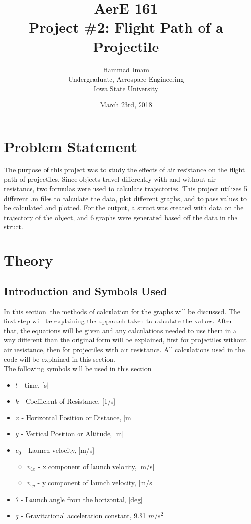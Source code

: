 \documentclass[oneside]{article}
\title{AerE 161 \\ Project \#2: Flight Path of a Projectile}
\author{Hammad Imam \\ Undergraduate, Aerospace Engineering \\ Iowa State University}
\date{March 23rd,	2018}
\begin{document}
\begin{titlepage}
\maketitle
\end{titlepage}

\clearpage
\tableofcontents

\newpage

\section{Problem Statement}
The purpose of this project was to study the effects of air resistance on the flight path of projectiles. Since objects travel differently with and without air resistance, two formulas were used to calculate trajectories. This project utilizes 5 different .m files to calculate the data, plot different graphs, and to pass values to be calculated and plotted. For the output, a struct was created with data on the trajectory of the object, and 6 graphs were generated based off the data in the struct.

\newpage
\section{Theory}
\subsection{Introduction and Symbols Used}
In this section, the methods of calculation for the graphs will be discussed. The first step will be explaining the approach taken to calculate the values. After that, the equations will be given and any calculations needed to use them in a way different than the original form will be explained, first for projectiles without air resistance, then for projectiles with air resistance. All calculations used in the code will be explained in this section.\\
The following symbols will be used in this section
\begin{itemize}
    \item $t$ - time, [s]
    \item $k$ - Coefficient of Resistance, [1/s]
    \item $x$ - Horizontal Position or Distance, [m]
    \item $y$ - Vertical Position or Altitude, [m]
    \item $v_0$ - Launch velocity, [m/s]
    \begin{itemize}
        \item $v_{0x}$ - x component of launch velocity, [m/s]
        \item $v_{0y}$ - y component of launch velocity, [m/s]
    \end{itemize}
    \item $\theta$ - Launch angle from the horizontal, [deg]
    \item $g$ - Gravitational acceleration constant, 9.81 $m/s^2$
\end{itemize}
\end{document}

